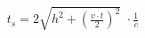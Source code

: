 \documentclass[preview]{standalone}
\begin{document}
\begin{align*}
t_s=2 \sqrt{h^2+( \frac{v \cdot t}{2})^2}\,\,\cdot {\frac{1}{c}}
\end{align*}
\end{document}
